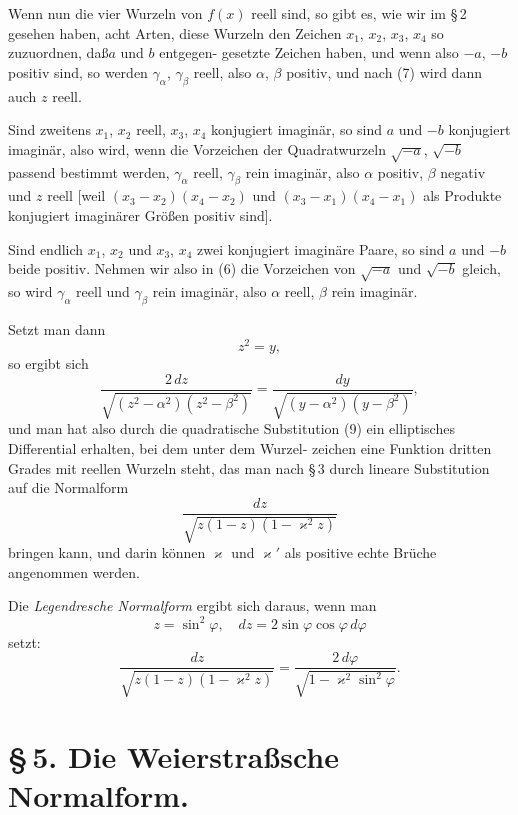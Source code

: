 \documentclass[12pt,a4paper]{book}
\theoremstyle{definition}
\begin{document}
Wenn nun die vier Wurzeln von $f(x)$ reell sind, so gibt es,
wie wir im \S\,2 gesehen haben, acht Arten, diese Wurzeln den
Zeichen $x_1$, $x_2$, $x_3$, $x_4$ so zuzuordnen, da\ss $a$ und $b$ entgegen-
gesetzte Zeichen haben, und wenn also $-a$, $-b$ positiv sind, so
werden $\gamma_\alpha$, $\gamma_\beta$ reell, also $\alpha$, $\beta$ positiv, und nach (7) wird dann
auch $z$ reell.

Sind zweitens $x_1$, $x_2$ reell, $x_3$, $x_4$ konjugiert imagin\"ar, so sind
$a$ und $-b$ konjugiert imagin\"ar, also wird, wenn die Vorzeichen
der Quadratwurzeln $\sqrt{-a}$, $\sqrt{-b}$ passend bestimmt werden, $\gamma_\alpha$
reell, $\gamma_\beta$ rein imagin\"ar, also $\alpha$ positiv, $\beta$ negativ und $z$ reell [weil
$(x_3 - x_2)(x_4 - x_2)$ und $(x_3 - x_1)(x_4 - x_1)$ als Produkte konjugiert imagin\"arer
Gr\"o\ss en positiv sind].

Sind endlich $x_1$, $x_2$ und $x_3$, $x_4$ zwei konjugiert imagin\"are
Paare, so sind $a$ und $-b$ beide positiv. Nehmen wir also in (6)
die Vorzeichen von $\sqrt{-a}$ und $\sqrt{-b}$ gleich, so wird $\gamma_\alpha$ reell
und $\gamma_\beta$ rein imagin\"ar, also $\alpha$ reell, $\beta$ rein imagin\"ar.

Setzt man dann
\begin{equation}
z^2 = y, \tag{9}
\end{equation}
so ergibt sich
\begin{equation}
\frac{2\,dz}{\sqrt{(z^2 - \alpha^2)(z^2 - \beta^2)}} = \frac{dy}{\sqrt{(y - \alpha^2)(y - \beta^2)}},
\end{equation}
und man hat also durch die quadratische Substitution (9)
ein elliptisches Differential erhalten, bei dem unter dem Wurzel-
zeichen eine Funktion dritten Grades mit reellen Wurzeln steht,
das man nach \S\,3 durch lineare Substitution auf die Normalform
\[
\frac{dz}{\sqrt{z(1 - z)(1 - \varkappa^2 z)}}
\]
bringen kann, und darin k\"onnen $\varkappa$ und $\varkappa'$ als positive echte
Br\"uche angenommen werden.

Die \emph{Legendresche Normalform} ergibt sich daraus, wenn man
\[
z = \sin^2 \varphi, \quad dz = 2\sin\varphi\cos\varphi\,d\varphi
\]
setzt:
\begin{equation}
\frac{dz}{\sqrt{z(1 - z)(1 - \varkappa^2 z)}} = \frac{2\,d\varphi}{\sqrt{1 - \varkappa^2 \sin^2 \varphi}}. \tag{a}
\end{equation}

\section*{\S\,5. Die Weierstra\ss sche Normalform.}
\end{document}
